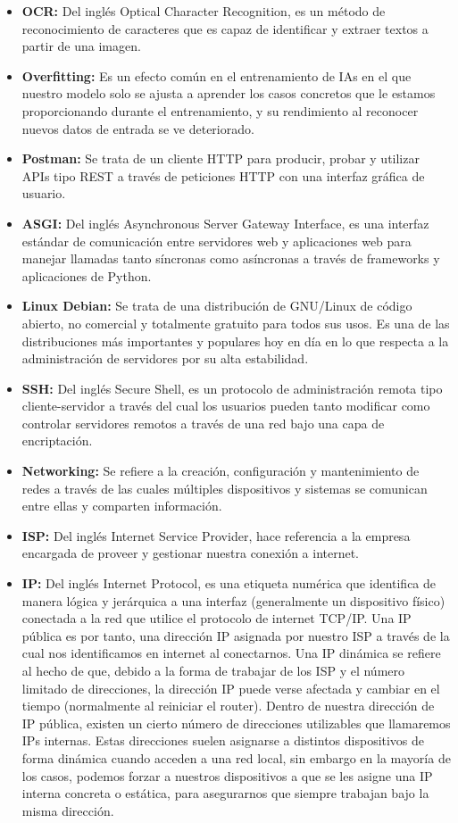 \documentclass{article}
\begin{document}
\begin{itemize}
	\item \textbf{OCR:} Del inglés Optical Character Recognition, es un método de reconocimiento de caracteres que es capaz de identificar y extraer textos a partir de una imagen.
	\item \textbf{Overfitting:} Es un efecto común en el entrenamiento de IAs en el que nuestro modelo solo se ajusta a aprender los casos concretos que le estamos proporcionando durante el entrenamiento, y su rendimiento al reconocer nuevos datos de entrada se ve deteriorado.
	\item \textbf{Postman:} Se trata de un cliente HTTP para producir, probar y utilizar APIs tipo REST a través de peticiones HTTP con una interfaz gráfica de usuario.
	\item \textbf{ASGI:} Del inglés Asynchronous Server Gateway Interface, es una interfaz estándar de comunicación entre servidores web y aplicaciones web para manejar llamadas tanto síncronas como asíncronas a través de frameworks y aplicaciones de Python.
	\item \textbf{Linux Debian:} Se trata de una distribución de GNU/Linux de código abierto, no comercial y totalmente gratuito para todos sus usos. Es una de las distribuciones más importantes y populares hoy en día en lo que respecta a la administración de servidores por su alta estabilidad.
	\item \textbf{SSH:} Del inglés Secure Shell, es un protocolo de administración remota tipo cliente-servidor a través del cual los usuarios pueden tanto modificar como controlar servidores remotos a través de una red bajo una capa de encriptación.
	\item \textbf{Networking:} Se refiere a la creación, configuración y mantenimiento de redes a través de las cuales múltiples dispositivos y sistemas se comunican entre ellas y comparten información.
	\item \textbf{ISP:} Del inglés Internet Service Provider, hace referencia a la empresa encargada de proveer y gestionar nuestra conexión a internet.
	\item \textbf{IP:} Del inglés Internet Protocol, es una etiqueta numérica que identifica de manera lógica y jerárquica a una interfaz (generalmente un dispositivo físico) conectada a la red que utilice el protocolo de internet TCP/IP. Una IP pública es por tanto, una dirección IP asignada por nuestro ISP a través de la cual nos identificamos en internet al conectarnos.
	Una IP dinámica se refiere al hecho de que, debido a la forma de trabajar de los ISP y el número limitado de direcciones, la dirección IP puede verse afectada y cambiar en el tiempo (normalmente al reiniciar el router). Dentro de nuestra dirección de IP pública, existen un cierto número de direcciones utilizables que llamaremos IPs internas. Estas direcciones suelen asignarse a distintos dispositivos de forma dinámica cuando acceden a una red local, sin embargo en la mayoría de los casos, podemos forzar a nuestros dispositivos a que se les asigne una IP interna concreta o estática, para asegurarnos que siempre trabajan bajo la misma dirección.

\end{itemize}
\end{document}
